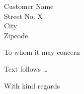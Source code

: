 \documentclass[fontsize=12pt, paper=a4]{scrlttr2}
\begin{document}
\begin{letter}{Customer Name\\ Street No. X \\ City \\ Zipcode}
  \opening{To whom it may concern} %
  Text follows \ldots
  \bigskip
  \closing{With kind regards} %
\end{letter}
\end{document}
